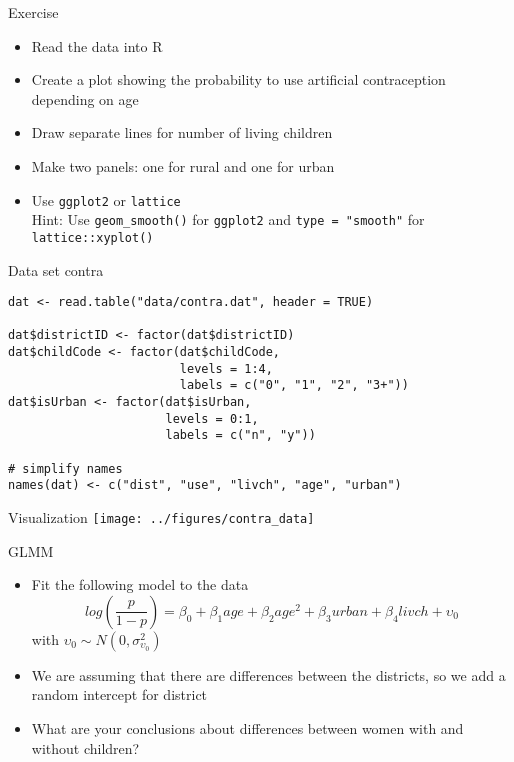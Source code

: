 \documentclass[aspectratio=169]{beamer}
\begin{document}
\begin{frame}{}
  \begin{block}{Exercise}
    \begin{itemize}
      \item Read the data into R
      \item Create a plot showing the probability to use artificial
        contraception depending on age
      \item Draw separate lines for number of living children
      \item Make two panels: one for rural and one for urban
      \item Use \texttt{ggplot2} or \texttt{lattice}\\[1.8ex]
            Hint: Use \texttt{geom\_smooth()} for \texttt{ggplot2} and
            \texttt{type = "smooth"} for \texttt{lattice::xyplot()}
    \end{itemize}
  \end{block}
\end{frame}

\begin{frame}[fragile]{Data set contra}
\begin{lstlisting}
dat <- read.table("data/contra.dat", header = TRUE)

dat$districtID <- factor(dat$districtID)
dat$childCode <- factor(dat$childCode,
                        levels = 1:4,
                        labels = c("0", "1", "2", "3+"))
dat$isUrban <- factor(dat$isUrban,
                      levels = 0:1,
                      labels = c("n", "y"))

# simplify names
names(dat) <- c("dist", "use", "livch", "age", "urban")
\end{lstlisting}
\end{frame}

\begin{frame}{Visualization}
  \centering
  \texttt{[image: ../figures/contra\_data]}
\end{frame}

\begin{frame}{GLMM}
  \begin{itemize}
    \item Fit the following model to the data
      \[
        log(\frac{p}{1-p}) = \beta_0 + \beta_1 age + \beta_2 age^2 + \beta_3
        urban + \beta_4 livch + \upsilon_0
      \]
      with $\upsilon_0 \sim N(0, \sigma_{\upsilon_0}^2)$
    \item We are assuming that there are differences between the districts, so
      we add a random intercept for district
    \item What are your conclusions about differences between women with and
      without children?
  \end{itemize}
\end{frame}
\end{document}
